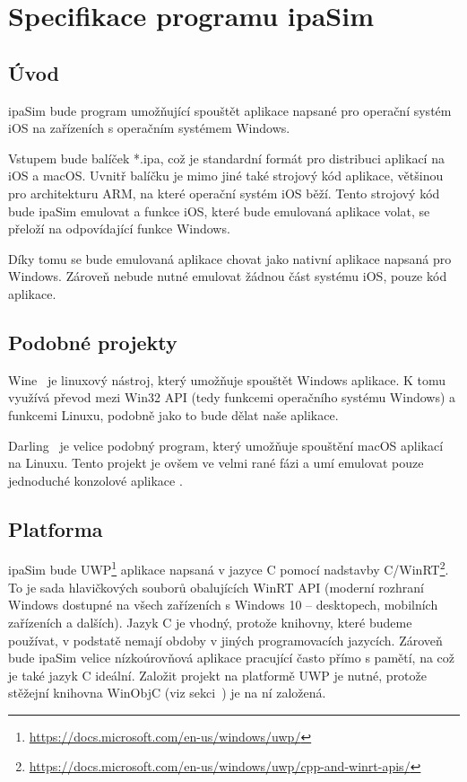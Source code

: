 \documentclass[12pt]{article}
\newcommand{\Rplus}{\protect\hspace{-.1em}\protect\raisebox{.35ex}{\smaller{\smaller\textbf{+}}}}
\newcommand{\Cpp}{\mbox{C\Rplus\Rplus}\xspace}
\begin{document}
\section*{Specifikace programu ipaSim}

\subsection*{Úvod}

ipaSim bude program umožňující spouštět aplikace napsané pro operační systém iOS na zařízeních s operačním systémem Windows.

Vstupem bude balíček *.ipa, což je standardní formát pro distribuci aplikací na iOS a macOS.
Uvnitř balíčku je mimo jiné také strojový kód aplikace, většinou pro architekturu ARM, na které operační systém iOS běží.
Tento strojový kód bude ipaSim emulovat a funkce iOS, které bude emulovaná aplikace volat, se přeloží na odpovídající funkce Windows.

Díky tomu se bude emulovaná aplikace chovat jako nativní aplikace napsaná pro Windows.
Zároveň nebude nutné emulovat žádnou část systému iOS, pouze kód aplikace.

\subsection*{Podobné projekty}

Wine~\cite{wine} je linuxový nástroj, který umožňuje spouštět Windows aplikace.
K tomu využívá převod mezi Win32 API (tedy funkcemi operačního systému Windows) a funkcemi Linuxu, podobně jako to bude dělat naše aplikace.

Darling~\cite{darling} je velice podobný program, který umožňuje spouštění macOS aplikací na Linuxu.
Tento projekt je ovšem ve velmi rané fázi a umí emulovat pouze jednoduché konzolové aplikace \cite{darlingStatus}.

\subsection*{Platforma}

ipaSim bude UWP\footnote{\url{https://docs.microsoft.com/en-us/windows/uwp/}} aplikace napsaná v jazyce \Cpp pomocí nadstavby \Cpp/WinRT\footnote{\url{https://docs.microsoft.com/en-us/windows/uwp/cpp-and-winrt-apis/}}.
To je sada hlavičkových souborů obalujících WinRT API (moderní rozhraní Windows dostupné na všech zařízeních s Windows 10 -- desktopech, mobilních zařízeních a dalších).
Jazyk \Cpp je vhodný, protože knihovny, které budeme používat, v podstatě nemají obdoby v jiných programovacích jazycích.
Zároveň bude ipaSim velice nízkoúrovňová aplikace pracující často přímo s pamětí, na což je také jazyk \Cpp ideální.
Založit projekt na platformě UWP je nutné, protože stěžejní knihovna WinObjC (viz sekci~) je na ní založená.
\end{document}

